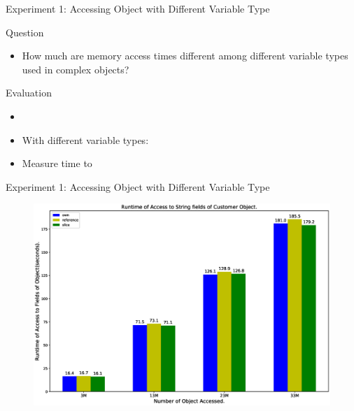 \documentclass[9pt]{beamer}
\begin{document}

\begin{frame}[fragile]{Experiment 1: Accessing Object with Different Variable Type}

    Question
    \begin{itemize}
        \item How much are memory access times different among different variable types used in complex objects?
    \end{itemize}

    Evaluation
    \begin{itemize}
        \item {}
        \item With different variable types: 
        \item Measure time to 
    \end{itemize}

\end{frame}


\begin{frame}[fragile]{Experiment 1: Accessing Object with Different Variable Type}

    \begin{figure}[hp]
        \centering
        \begin{center}
                \includegraphics[width=1\textwidth]{images/rust_access_different_poniter_init.eps}
                \captionsetup{labelformat=empty}
        \end{center}
    \end{figure}
\end{frame}
\end{document}
